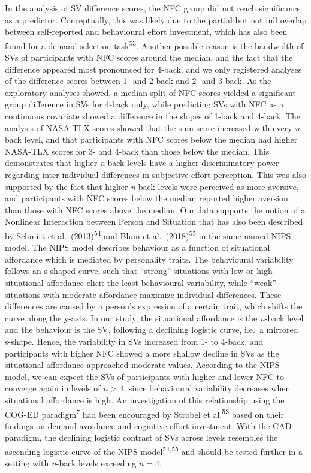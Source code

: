 \documentclass[
  man,floatsintext]{apa6}
\begin{document}
In the analysis of SV difference scores, the NFC group did not reach significance as a predictor.
Conceptually, this was likely due to the partial but not full overlap between self-reported and behavioural effort investment, which has also been found for a demand selection task\textsuperscript{53}.
Another possible reason is the bandwidth of SVs of participants with NFC scores around the median, and the fact that the difference appeared most pronounced for 4-back, and we only registered analyses of the difference scores between 1- and 2-back and 2- and 3-back.
As the exploratory analyses showed, a median split of NFC scores yielded a significant group difference in SVs for 4-back only, while predicting SVs with NFC as a continuous covariate showed a difference in the slopes of 1-back and 4-back.
The analysis of NASA-TLX scores showed that the sum score increased with every \emph{n}-back level, and that participants with NFC scores below the median had higher NASA-TLX scores for 3- and 4-back than those below the median.
This demonstrates that higher \emph{n}-back levels have a higher discriminatory power regarding inter-individual differences in subjective effort perception.
This was also supported by the fact that higher \emph{n}-back levels were perceived as more aversive, and participants with NFC scores below the median reported higher aversion than those with NFC scores above the median.
Our data supports the notion of a Nonlinear Interaction between Person and Situation that has also been described by Schmitt et al.~(2013)\textsuperscript{54} and Blum et al.~(2018)\textsuperscript{55} in the same-named NIPS model.
The NIPS model describes behaviour as a function of situational affordance which is mediated by personality traits.
The behavioural variability follows an s-shaped curve, such that ``strong'' situations with low or high situational affordance elicit the least behavioural variability, while ``weak'' situations with moderate affordance maximize individual differences.
These differences are caused by a person's expression of a certain trait, which shifts the curve along the y-axis.
In our study, the situational affordance is the \emph{n}-back level and the behaviour is the SV, following a declining logistic curve, i.e.~a mirrored s-shape.
Hence, the variability in SVs increased from 1- to 4-back, and participants with higher NFC showed a more shallow decline in SVs as the situational affordance approached moderate values.
According to the NIPS model, we can expect the SVs of participants with higher and lower NFC to converge again in levels of \(n>4\), since behavioural variability decreases when situational affordance is high.
An investigation of this relationship using the COG-ED paradigm\textsuperscript{7} had been encouraged by Strobel et al.\textsuperscript{53} based on their findings on demand avoidance and cognitive effort investment.
With the CAD paradigm, the declining logistic contrast of SVs across levels resembles the ascending logistic curve of the NIPS model\textsuperscript{54,55} and should be tested further in a setting with \emph{n}-back levels exceeding \(n=4\).
\end{document}
